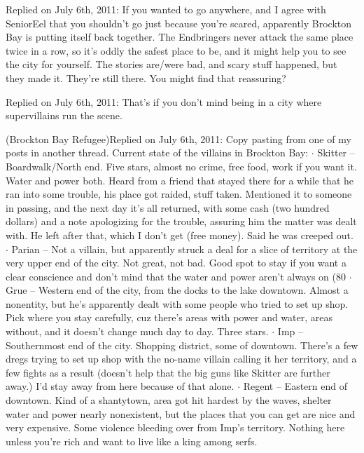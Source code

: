 \blacktriangleright  {}
Replied on July 6th, 2011:
If you wanted to go anywhere, and I agree with SeniorEel that you shouldn't go just because you're scared, apparently Brockton Bay is putting itself back together.  The Endbringers never attack the same place twice in a row, so it's oddly the safest place to be, and it might help you to see the city for yourself.  The stories are/were bad, and scary stuff happened, but they made it.  They're still there.  You might find that reassuring?



\blacktriangleright  {}
Replied on July 6th, 2011:
That's if you don't mind being in a city where supervillains run the scene.



\blacktriangleright {} (Brockton Bay Refugee)Replied on July 6th, 2011:
Copy pasting from one of my posts in another thread.  Current state of the villains in Brockton Bay:
$\cdot$  Skitter – Boardwalk/North end.  Five stars, almost no crime, free food, work if you want it.  Water and power both.  Heard from a friend that stayed there for a while that he ran into some trouble, his place got raided, stuff taken.  Mentioned it to someone in passing, and the next day it's all returned, with some cash (two hundred dollars) and a note apologizing for the trouble, assuring him the matter was dealt with.  He left after that, which I don't get (free money).  Said he was creeped out.
$\cdot$  Parian – Not a villain, but apparently struck a deal for a slice of territory at the very upper end of the city.  Not great, not bad.  Good spot to stay if you want a clear conscience and don't mind that the water and power aren't always on (80%
$\cdot$  Grue – Western end of the city, from the docks to the lake downtown.  Almost a nonentity, but he's apparently dealt with some people who tried to set up shop.  Pick where you stay carefully, cuz there's areas with power and water, areas without, and it doesn't change much day to day.  Three stars.
$\cdot$  Imp – Southernmost end of the city.  Shopping district, some of downtown.  There's a few dregs trying to set up shop with the no-name villain calling it her territory, and a few fights as a result (doesn't help that the big guns like Skitter are further away.)  I'd stay away from here because of that alone.
$\cdot$  Regent – Eastern end of downtown.  Kind of a shantytown, area got hit hardest by the waves, shelter water and power nearly nonexistent, but the places that you can get are nice and very expensive.  Some violence bleeding over from Imp's territory.  Nothing here unless you're rich and want to live like a king among serfs.



